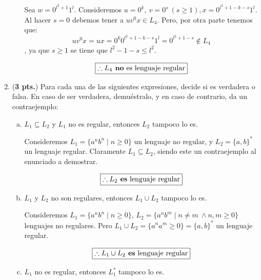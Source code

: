 \documentclass{article}
\begin{document}
\begin{enumerate}
\begin{enumerate}[a)]
          Sea $w = 0^{l^2 + 1}1^l$. Consideremos $u = 0^k,~ v = 0^s ~ (s \ge 1), x = 0^{l^2+1 - k - s}1^l$. Al hacer $s = 0$ debemos tener a $uv^0x \in L_4$. Pero, por otra parte tenemos que:
          $$uv^0x = ux = 0^k0^{l^2 + 1 - k - s}1^l = 0^{l^2 + 1 - s} \notin L_4$$,
          ya que $s \ge 1$ se tiene que $l^2 - 1 - s \le l^2$.

          $$\boxed{\therefore L_4 \text{\textbf{ no} es lenguaje regular}}$$

      \end{enumerate}

    \item (\textbf{3 pts.}) Para cada una de las siguientes expresiones, decide si es verdadera o falsa. En caso de ser verdadera, demuéstralo, y en caso de contrario, da un contraejemplo:
      \begin{enumerate}[a)]
        \item $L_1 \subseteq L_2$ y $L_1$ no es regular, entonces $L_2$ tampoco lo es.

          Consideremos $L_1 = \{a^nb^n \mid n \ge 0\}$ un lenguaje no regular, y $L_2 = \{a,b\}^*$ un lenguaje regular. Claramente $L_1 \subseteq L_2$, siendo este un contraejemplo al enunciado a demostrar.
          
          $$\boxed{\therefore L_2 \text{\textbf{ es} lenguaje regular}}$$

        \item $L_1$ y $L_2$ no son regulares, entonces $L_1 \cup L_2$ tampoco lo es.

          Consideremos $L_1 = \{a^nb^n \mid n \ge 0\}$, $L_2 = \{a^nb^m \mid n \neq m\ \land n,m \ge 0 \}$ lenguajes no regulares. Pero $L_1 \cup L_2 = \{a^na^m \ge 0\} = \{a,b\}^*$ un lenguaje regular.

          $$\boxed{\therefore L_1 \cup L_2 \text{\textbf{ es} lenguaje regular}}$$

        \item $L_1$ no es regular, entonces $L_1^*$ tampoco lo es.
          



\end{enumerate}
\end{enumerate}
\end{document}
